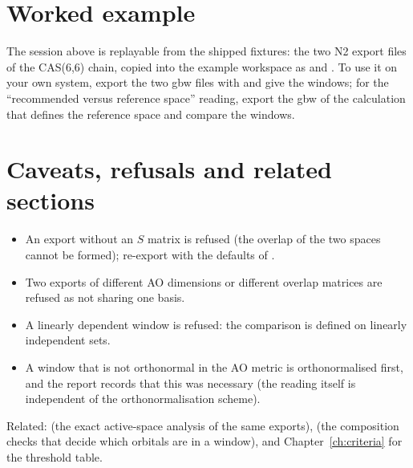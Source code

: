 \section{Worked example}

The session above is replayable from the shipped fixtures: the two N2 export
files of the CAS(6,6) chain, copied into the example workspace as
 and . To use it on your own system,
export the two gbw files with  and give the windows; for the
``recommended versus reference space'' reading, export the gbw of the
calculation that defines the reference space and compare the windows.

\section{Caveats, refusals and related sections}

\begin{refusalbox}
\begin{itemize}
  \item An export without an $S$ matrix is refused (the overlap of the two
    spaces cannot be formed); re-export with the defaults of .
  \item Two exports of different AO dimensions or different overlap matrices
    are refused as not sharing one basis.
  \item A linearly dependent window is refused: the comparison is defined on
    linearly independent sets.
  \item A window that is not orthonormal in the AO metric is orthonormalised
    first, and the report records that this was necessary (the reading itself is
    independent of the orthonormalisation scheme).
\end{itemize}
\end{refusalbox}

Related:  (the exact active-space analysis of the same exports),
 (the composition checks that decide which orbitals are in a window),
and Chapter~\ref{ch:criteria} for the threshold table.
